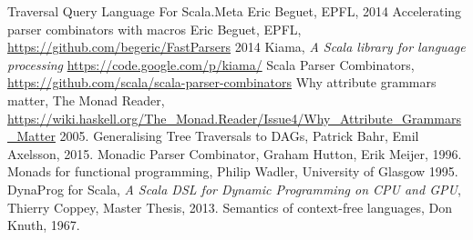 \begin{thebibliography}{9}
  Traversal Query Language For Scala.Meta
  Eric Beguet, EPFL,
  2014
  Accelerating parser combinators with macros
  Eric Beguet, EPFL,
  \url{https://github.com/begeric/FastParsers}
  2014
  Kiama,
  \emph{A Scala library for language processing}
  \url{https://code.google.com/p/kiama/}
  Scala Parser Combinators,
  \url{https://github.com/scala/scala-parser-combinators}
  Why attribute grammars matter,
  The Monad Reader,
  \url{https://wiki.haskell.org/The_Monad.Reader/Issue4/Why_Attribute_Grammars_Matter}
  2005.
  Generalising Tree Traversals to DAGs,
  Patrick Bahr, Emil Axelsson,
  2015.
  Monadic Parser Combinator,
  Graham Hutton, Erik Meijer,
  1996.
  Monads for functional programming,
  Philip Wadler, University of Glasgow
  1995.
  DynaProg for Scala,
  \emph{A Scala DSL for Dynamic Programming on CPU and GPU},
  Thierry Coppey, Master Thesis,
  2013.
  Semantics of context-free languages,
  Don Knuth,
  1967.
\end{thebibliography}
